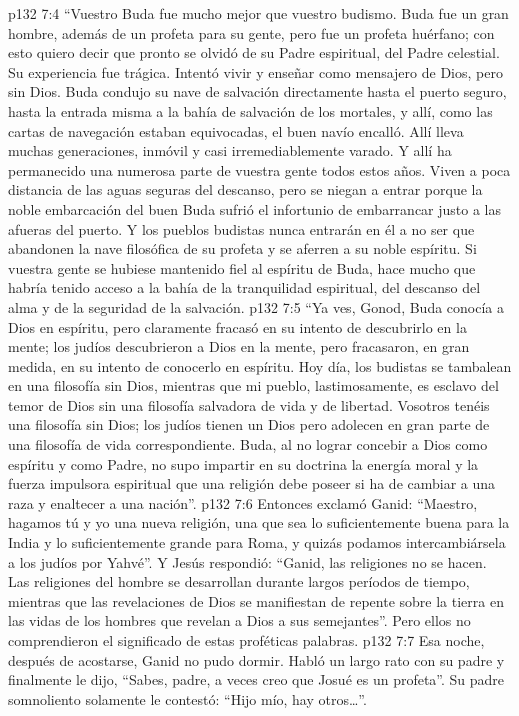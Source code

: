\vs p132 7:4 “Vuestro Buda fue mucho mejor que vuestro budismo. Buda fue un gran hombre, además de un profeta para su gente, pero fue un profeta huérfano; con esto quiero decir que pronto se olvidó de su Padre espiritual, del Padre celestial. Su experiencia fue trágica. Intentó vivir y enseñar como mensajero de Dios, pero sin Dios. Buda condujo su nave de salvación directamente hasta el puerto seguro, hasta la entrada misma a la bahía de salvación de los mortales, y allí, como las cartas de navegación estaban equivocadas, el buen navío encalló. Allí lleva muchas generaciones, inmóvil y casi irremediablemente varado. Y allí ha permanecido una numerosa parte de vuestra gente todos estos años. Viven a poca distancia de las aguas seguras del descanso, pero se niegan a entrar porque la noble embarcación del buen Buda sufrió el infortunio de embarrancar justo a las afueras del puerto. Y los pueblos budistas nunca entrarán en él a no ser que abandonen la nave filosófica de su profeta y se aferren a su noble espíritu. Si vuestra gente se hubiese mantenido fiel al espíritu de Buda, hace mucho que habría tenido acceso a la bahía de la tranquilidad espiritual, del descanso del alma y de la seguridad de la salvación.
\vs p132 7:5 “Ya ves, Gonod, Buda conocía a Dios en espíritu, pero claramente fracasó en su intento de descubrirlo en la mente; los judíos descubrieron a Dios en la mente, pero fracasaron, en gran medida, en su intento de conocerlo en espíritu. Hoy día, los budistas se tambalean en una filosofía sin Dios, mientras que mi pueblo, lastimosamente, es esclavo del temor de Dios sin una filosofía salvadora de vida y de libertad. Vosotros tenéis una filosofía sin Dios; los judíos tienen un Dios pero adolecen en gran parte de una filosofía de vida correspondiente. Buda, al no lograr concebir a Dios como espíritu y como Padre, no supo impartir en su doctrina la energía moral y la fuerza impulsora espiritual que una religión debe poseer si ha de cambiar a una raza y enaltecer a una nación”.
\vs p132 7:6 Entonces exclamó Ganid: “Maestro, hagamos tú y yo una nueva religión, una que sea lo suficientemente buena para la India y lo suficientemente grande para Roma, y quizás podamos intercambiársela a los judíos por Yahvé”. Y Jesús respondió: “Ganid, las religiones no se hacen. Las religiones del hombre se desarrollan durante largos períodos de tiempo, mientras que las revelaciones de Dios se manifiestan de repente sobre la tierra en las vidas de los hombres que revelan a Dios a sus semejantes”. Pero ellos no comprendieron el significado de estas proféticas palabras.
\vs p132 7:7 \pc Esa noche, después de acostarse, Ganid no pudo dormir. Habló un largo rato con su padre y finalmente le dijo, “Sabes, padre, a veces creo que Josué es un profeta”. Su padre somnoliento solamente le contestó: “Hijo mío, hay otros\ldots ”.
